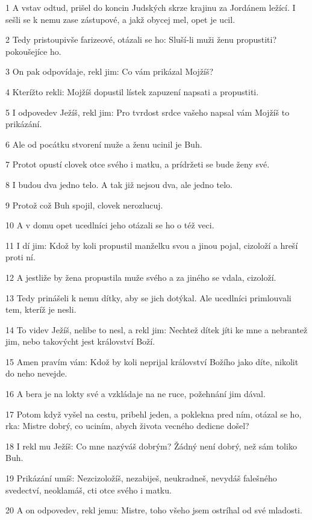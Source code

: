 \par 1 A vstav odtud, prišel do koncin Judských skrze krajinu za Jordánem ležící. I sešli se k nemu zase zástupové, a jakž obycej mel, opet je ucil.
\par 2 Tedy pristoupivše farizeové, otázali se ho: Sluší-li muži ženu propustiti? pokoušejíce ho.
\par 3 On pak odpovídaje, rekl jim: Co vám prikázal Mojžíš?
\par 4 Kterížto rekli: Mojžíš dopustil lístek zapuzení napsati a propustiti.
\par 5 I odpovedev Ježíš, rekl jim: Pro tvrdost srdce vašeho napsal vám Mojžíš to prikázání.
\par 6 Ale od pocátku stvorení muže a ženu ucinil je Buh.
\par 7 Protot opustí clovek otce svého i matku, a prídržeti se bude ženy své.
\par 8 I budou dva jedno telo. A tak již nejsou dva, ale jedno telo.
\par 9 Protož což Buh spojil, clovek nerozlucuj.
\par 10 A v domu opet ucedlníci jeho otázali se ho o též veci.
\par 11 I dí jim: Kdož by koli propustil manželku svou a jinou pojal, cizoloží a hreší proti ní.
\par 12 A jestliže by žena propustila muže svého a za jiného se vdala, cizoloží.
\par 13 Tedy prinášeli k nemu dítky, aby se jich dotýkal. Ale ucedlníci primlouvali tem, kteríž je nesli.
\par 14 To videv Ježíš, nelibe to nesl, a rekl jim: Nechtež dítek jíti ke mne a nebrantež jim, nebo takovýcht jest království Boží.
\par 15 Amen pravím vám: Kdož by koli neprijal království Božího jako díte, nikolit do neho nevejde.
\par 16 A bera je na lokty své a vzkládaje na ne ruce, požehnání jim dával.
\par 17 Potom když vyšel na cestu, pribehl jeden, a poklekna pred ním, otázal se ho, rka: Mistre dobrý, co uciním, abych života vecného dedicne došel?
\par 18 I rekl mu Ježíš: Co mne nazýváš dobrým? Žádný není dobrý, než sám toliko Buh.
\par 19 Prikázání umíš: Nezcizoložíš, nezabiješ, neukradneš, nevydáš falešného svedectví, neoklamáš, cti otce svého i matku.
\par 20 A on odpovedev, rekl jemu: Mistre, toho všeho jsem ostríhal od své mladosti.
